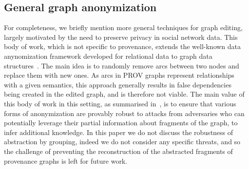 \subsection{General graph anonymization}

For completeness, we briefly mention more general techniques for graph editing, largely motivated by the need to preserve privacy in social network data. This body of work, which is not specific to provenance, extends the well-known data anynomization framework developed for relational data to graph data structures~\citep{springerlink:10.1007/978-3-540-78478-4_9,Bhagat:2009:CGA:1687627.1687714,Liu:2008:TIA:1376616.1376629}. The main idea is to randomly remove arcs between two nodes and replace them with new ones. As arcs in PROV graphs represent relationships with a given semantics, this approach generally results in false dependencies being created in the edited graph, and is therefore not viable. 
%
The main value of this body of work in this setting, as summarised in~\citep{Zhou:2008:BSA:1540276.1540279}, is to ensure that various forms of anonymization are provably robust to attacks from adversaries who can potentially leverage their partial information about fragments of the graph, to infer additional knowledge. In this paper we do not discuss the robustness of abstraction by grouping, indeed we do not consider any specific threats, and so the challenge of preventing the reconstruction of the abstracted fragments of provenance graphs is left for future work.



